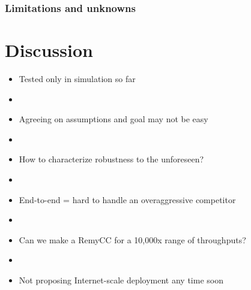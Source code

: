 \documentclass[svgnames]{beamer}
\begin{document}
\begin{frame}
\frametitle{Limitations and unknowns}

\section{Discussion}

\begin{itemize}
\item Tested only in simulation so far

\item[]

\item Agreeing on assumptions and goal may not be easy

\item[]

\item How to characterize robustness to the unforeseen?

\item[]

\item End-to-end = hard to handle an overaggressive competitor

\item[]

\item Can we make a RemyCC for a 10,000x range of throughputs?

\item[]

\item Not proposing Internet-scale deployment any time soon

\end{itemize}

\end{frame}
\end{document}

